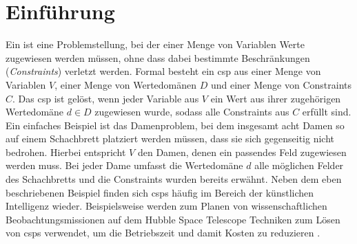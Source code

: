 \section{Einführung}
Ein  ist eine Problemstellung, bei der einer Menge von Variablen Werte zugewiesen werden müssen, ohne dass dabei bestimmte Beschränkungen (\textit{Constraints}) 
verletzt werden. Formal besteht ein \ac*{csp} aus einer Menge von Variablen $V$, einer Menge von Wertedomänen $D$ und einer Menge von Constraints $C$. Das \ac*{csp} ist gelöst,
wenn jeder Variable aus $V$ ein Wert aus ihrer zugehörigen Wertedomäne $d \in D$ zugewiesen wurde, sodass alle Constraints aus $C$ erfüllt sind. Ein einfaches Beispiel ist das
Damenproblem, bei dem insgesamt acht Damen so auf einem Schachbrett platziert werden müssen, dass sie sich gegenseitig nicht bedrohen. Hierbei entspricht $V$ den Damen, denen
ein passendes Feld zugewiesen werden muss. Bei jeder Dame umfasst die Wertedomäne $d$ alle möglichen Felder des Schachbretts und die Constraints wurden bereits erwähnt. Neben
dem eben beschriebenen Beispiel finden sich \acp{csp} häufig im Bereich der künstlichen Intelligenz wieder. Beispielsweise werden zum Planen von wissenschaftlichen
Beobachtungsmissionen auf dem Hubble Space Telescope Techniken zum Lösen von \acp{csp} verwendet, um die Betriebszeit und damit Kosten zu reduzieren \cite{HubbleScheduling}.

